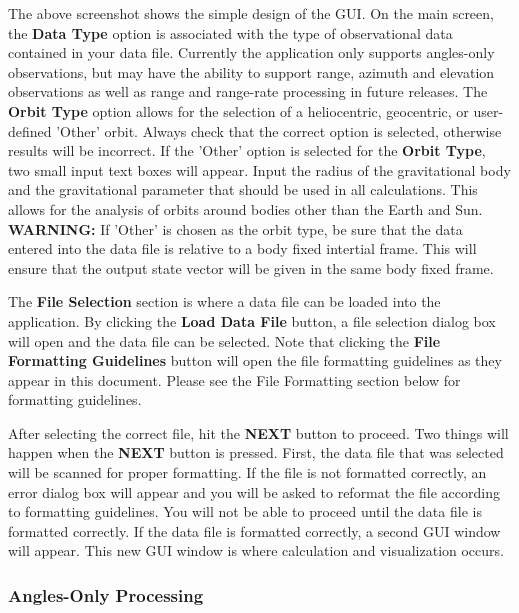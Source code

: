 \documentclass{article}
\begin{document}
			The above screenshot shows the simple design of the GUI. On the main screen, the \textbf{Data Type} option is associated with the type of observational data contained in your data file.
			Currently the application only supports angles-only observations, but may have the ability to support range, azimuth and elevation observations as well as range and range-rate processing in future       
                        	releases. The \textbf{Orbit Type} option allows for the selection of a heliocentric, geocentric, or user-defined 'Other' orbit. Always check that the correct option is selected, otherwise results will be incorrect.
			If the 'Other' option is selected for the \textbf{Orbit Type}, two small input text boxes will appear. Input the radius of the gravitational body and the gravitational parameter that should be used in all calculations.
			This allows for the analysis of orbits around bodies other than the Earth and Sun. \textbf{WARNING:} If 'Other' is chosen as the orbit type, be sure that the data entered into the data file is relative to a body fixed intertial frame.
			This will ensure that the output state vector will be given in the same body fixed frame. \par

			The \textbf{File Selection} section is where a data file can be loaded into the application. By clicking the \textbf{Load Data File} button, a file selection dialog box will open and the data file can be
			selected. Note that clicking the \textbf{File Formatting Guidelines} button will open the file formatting guidelines as they appear in this document. Please see the File Formatting section below for formatting guidelines. \par

                        	After selecting the correct file, hit the \textbf{NEXT} button to proceed. Two things will happen when the \textbf{NEXT} button is pressed. First, the data file that was selected will be scanned
			for proper formatting. If the file is not formatted correctly, an error dialog box will appear and you will be asked to reformat the file according to formatting guidelines. You will not be able to proceed
			until the data file is formatted correctly. If the data file is formatted correctly, a second GUI window will appear. This new GUI window is where calculation and visualization occurs.
			
			\subsubsection{Angles-Only Processing}
\end{document}
